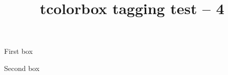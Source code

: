 \documentclass{article}
\title{tcolorbox tagging test -- 4}
\begin{document}
\begin{tcbraster}
\begin{tcolorbox}
First box
\end{tcolorbox}
\begin{tcolorbox}
Second box
\end{tcolorbox}
\end{tcbraster}
\end{document}
